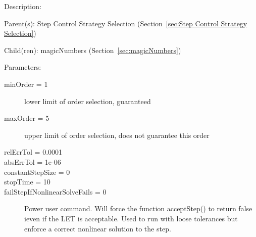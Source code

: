 \begin{list}{}
  {\setlength{\leftmargin}{1.0in}
   \setlength{\labelwidth}{0.75in}
   \setlength{\labelsep}{0.125in}}
  \item[Description:]
  \item[Parent(s):]
    Step Control Strategy Selection (Section~\ref{sec:Step Control Strategy Selection})
  \item[Child(ren):]
    magicNumbers (Section~\ref{sec:magicNumbers})
  \item[Parameters:]
    \begin{description}
      \item[minOrder = 1] 
lower limit of order selection, guaranteed
      \item[maxOrder = 5] 
upper limit of order selection, does not guarantee this order
      \item[relErrTol = 0.0001] 

      \item[absErrTol = 1e-06] 

      \item[constantStepSize = 0] 

      \item[stopTime = 10] 

      \item[failStepIfNonlinearSolveFails = 0] 
Power user command. Will force the function acceptStep() to return false ieven if the LET is acceptable.  Used to run with loose tolerances but enforce a correct nonlinear solution to the step.
\end{description}

\end{list}

